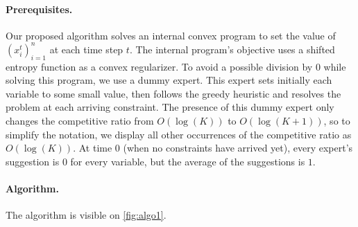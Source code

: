 \paragraph{Prerequisites.} Our proposed algorithm solves an internal convex program to set the value of $(x_i^t)_{i=1}^n$ at each time step $t$. The internal program's objective uses a shifted entropy function as a convex regularizer. To avoid a possible division by $0$ while solving this program, we use a dummy expert. This expert sets initially each variable to some small value, then follows the greedy heuristic and resolves the problem at each arriving constraint. The presence of this dummy expert only changes the competitive ratio from $O(\log(K))$ to $O(\log(K + 1))$, so to simplify the notation, we display all other occurrences of the competitive ratio as $O(\log(K))$. At time $0$ (when no constraints have arrived yet), every expert's suggestion is $0$ for every variable, but the average of the suggestions is $1$.

\paragraph{Algorithm.} The algorithm is visible on \cref{fig:algo1}.

